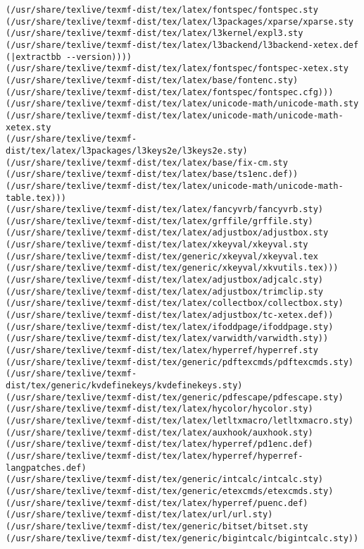 \documentclass[11pt]{article}
\begin{document}
\begin{Verbatim}[commandchars=\\\{\}]
(/usr/share/texlive/texmf-dist/tex/latex/fontspec/fontspec.sty
(/usr/share/texlive/texmf-dist/tex/latex/l3packages/xparse/xparse.sty
(/usr/share/texlive/texmf-dist/tex/latex/l3kernel/expl3.sty
(/usr/share/texlive/texmf-dist/tex/latex/l3backend/l3backend-xetex.def
(|extractbb --version))))
(/usr/share/texlive/texmf-dist/tex/latex/fontspec/fontspec-xetex.sty
(/usr/share/texlive/texmf-dist/tex/latex/base/fontenc.sty)
(/usr/share/texlive/texmf-dist/tex/latex/fontspec/fontspec.cfg)))
(/usr/share/texlive/texmf-dist/tex/latex/unicode-math/unicode-math.sty
(/usr/share/texlive/texmf-dist/tex/latex/unicode-math/unicode-math-xetex.sty
(/usr/share/texlive/texmf-dist/tex/latex/l3packages/l3keys2e/l3keys2e.sty)
(/usr/share/texlive/texmf-dist/tex/latex/base/fix-cm.sty
(/usr/share/texlive/texmf-dist/tex/latex/base/ts1enc.def))
(/usr/share/texlive/texmf-dist/tex/latex/unicode-math/unicode-math-table.tex)))
(/usr/share/texlive/texmf-dist/tex/latex/fancyvrb/fancyvrb.sty)
(/usr/share/texlive/texmf-dist/tex/latex/grffile/grffile.sty)
(/usr/share/texlive/texmf-dist/tex/latex/adjustbox/adjustbox.sty
(/usr/share/texlive/texmf-dist/tex/latex/xkeyval/xkeyval.sty
(/usr/share/texlive/texmf-dist/tex/generic/xkeyval/xkeyval.tex
(/usr/share/texlive/texmf-dist/tex/generic/xkeyval/xkvutils.tex)))
(/usr/share/texlive/texmf-dist/tex/latex/adjustbox/adjcalc.sty)
(/usr/share/texlive/texmf-dist/tex/latex/adjustbox/trimclip.sty
(/usr/share/texlive/texmf-dist/tex/latex/collectbox/collectbox.sty)
(/usr/share/texlive/texmf-dist/tex/latex/adjustbox/tc-xetex.def))
(/usr/share/texlive/texmf-dist/tex/latex/ifoddpage/ifoddpage.sty)
(/usr/share/texlive/texmf-dist/tex/latex/varwidth/varwidth.sty))
(/usr/share/texlive/texmf-dist/tex/latex/hyperref/hyperref.sty
(/usr/share/texlive/texmf-dist/tex/generic/pdftexcmds/pdftexcmds.sty)
(/usr/share/texlive/texmf-dist/tex/generic/kvdefinekeys/kvdefinekeys.sty)
(/usr/share/texlive/texmf-dist/tex/generic/pdfescape/pdfescape.sty)
(/usr/share/texlive/texmf-dist/tex/latex/hycolor/hycolor.sty)
(/usr/share/texlive/texmf-dist/tex/latex/letltxmacro/letltxmacro.sty)
(/usr/share/texlive/texmf-dist/tex/latex/auxhook/auxhook.sty)
(/usr/share/texlive/texmf-dist/tex/latex/hyperref/pd1enc.def)
(/usr/share/texlive/texmf-dist/tex/latex/hyperref/hyperref-langpatches.def)
(/usr/share/texlive/texmf-dist/tex/generic/intcalc/intcalc.sty)
(/usr/share/texlive/texmf-dist/tex/generic/etexcmds/etexcmds.sty)
(/usr/share/texlive/texmf-dist/tex/latex/hyperref/puenc.def)
(/usr/share/texlive/texmf-dist/tex/latex/url/url.sty)
(/usr/share/texlive/texmf-dist/tex/generic/bitset/bitset.sty
(/usr/share/texlive/texmf-dist/tex/generic/bigintcalc/bigintcalc.sty))

\end{Verbatim}
\end{document}
